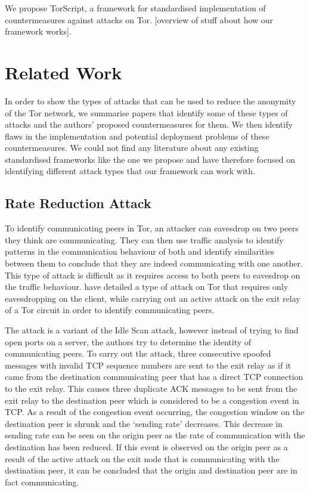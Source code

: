 \documentclass[9pt,technote]{IEEEtran}
\begin{document}
We propose TorScript, a framework for standardised implementation of countermeasures against attacks on Tor. [overview of stuff about how our framework works].

\cite{hayesguard}\cite{gilad2012spying}\cite{sun2015raptor}\cite{biryukov2012torscan}\cite{jansen2014sniper}\cite{tor}

\section{Related Work} 
\label{sec:relatedwork}
In order to show the types of attacks that can be used to reduce the anonymity of the Tor network, we summarise papers that identify some of these types of attacks and the authors' proposed countermeasures for them. We then identify flaws in the implementation and potential deployment problems of these countermeasures. We could not find any literature about any existing standardised frameworks like the one we propose and have therefore focused on identifying different attack types that our framework can work with.\\

\subsection{Rate Reduction Attack}
To identify communicating peers in Tor, an attacker can eavesdrop on two peers they think are communicating. They can then use traffic analysis to identify patterns in the communication behaviour of both and identify similarities between them to conclude that they are indeed communicating with one another. This type of attack is difficult as it requires access to both peers to eavesdrop on the traffic behaviour. \citeauthor{gilad2012spying} have detailed a type of attack on Tor that requires only eavesdropping on the client, while carrying out an active attack on the exit relay of a Tor circuit in order to identify communicating peers.

The attack is a variant of the Idle Scan attack, however instead of trying to find open ports on a server, the authors try to determine the identity of communicating peers. To carry out the attack, three consecutive spoofed messages with invalid TCP sequence numbers are sent to the exit relay as if it came from the destination communicating peer that has a direct TCP connection to the exit relay. This causes three duplicate ACK messages to be sent from the exit relay to the destination peer which is considered to be a congestion event in TCP. As a result of the congestion event occurring, the congestion window on the destination peer is shrunk and the `sending rate' decreases. This decrease in sending rate can be seen on the origin peer as the rate of communication with the destination has been reduced. If this event is observed on the origin peer as a result of the active attack on the exit node that is communicating with the destination peer, it can be concluded that the origin and destination peer are in fact communicating.
\end{document}
